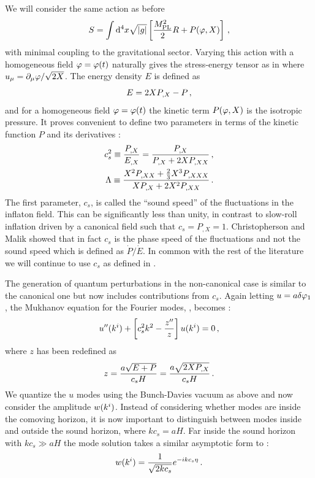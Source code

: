 We will consider the same action as before
% 
\begin{equation}
\label{eq:DBIaction-dbiintro2}
S=\int  \mathrm{d}^4x \sqrt{|g|} \left[ \frac{M_{\mathrm{PL}}^2}{2} R 
+ P (\varphi , X) \right] \,,
\end{equation}
% 
with minimal coupling to the gravitational sector. Varying this action with a
homogeneous field $\varphi=\varphi(t)$ naturally gives the stress-energy tensor as in
 where $u_\mu = \partial_\mu\varphi/\sqrt{2X}$. 
The energy density $E$ is defined as
\begin{equation}
 E = 2XP_{,X} - P\,,
\end{equation}
% 
and for a homogeneous field $\varphi=\varphi(t)$ the kinetic term $P(\varphi, X)$ is the
isotropic pressure. 
It proves convenient to define two parameters in terms of the 
kinetic function $P$ and its derivatives \cite{lidser1,lidser3}: 
% 
\begin{eqnarray}
\label{eq:defcs-dbiintro}
 c_s^2 \equiv \frac{P_{,X}}{E_{,X}} =  \frac{P_{,X}}{P_{,X} + 2X P_{,XX}} \,,
\\
\label{eq:deflambda-dbiintro}
\Lambda \equiv  \frac{X^2 P_{,XX} +
\frac{2}{3}X^3 P_{,XXX}}{X P_{,X} +
2X^2 P_{,XX}}\,.
\end{eqnarray}
% 
The first parameter, $c_s$, is called the ``sound speed'' of the fluctuations
in the inflaton field. This can be significantly less than unity, 
in contrast to slow-roll inflation driven by a canonical 
field such that $c_s = P_{,X} =1$.
% 
Christopherson and Malik \cite{Christopherson:2008ry} showed that in fact $c_s$
is the phase speed of the fluctuations and not the sound speed
which is defined as $\dot{P}/\dot{E}$. In common with the rest of the literature
we will continue to use $c_s$ as defined in . 

The generation of quantum perturbations in the non-canonical case is similar to
the canonical one but now includes contributions from $c_s$. Again letting
$u=a\delta\varphi_{1}$, the Mukhanov equation for the
Fourier modes, , becomes
\cite{gm}:
% 
\begin{equation}
 u''(k^i) + \left[c_s^2 k^2 - \frac{z''}{z}\right] u(k^i) = 0\,,
\end{equation}
% 
where $z$ has been redefined as
% 
\begin{equation}
 z = \frac{a\sqrt{E+P}}{c_s H} = \frac{a\sqrt{2XP_{,X}}}{c_s H} \,.
\end{equation}
% 
We quantize the $u$ modes using the Bunch-Davies vacuum as above and now
consider the amplitude $w(k^i)$. Instead of considering whether modes are
inside the comoving horizon, it is now important to distinguish between modes
inside and outside the sound horizon, where $kc_s = aH$. Far inside the sound
horizon with $kc_s \gg aH$ the mode solution takes a similar asymptotic form to
:
% 
\begin{equation}
 w(k^i) = \frac{1}{\sqrt{2kc_s}} e^{-ikc_s \eta}\,.
\end{equation}


